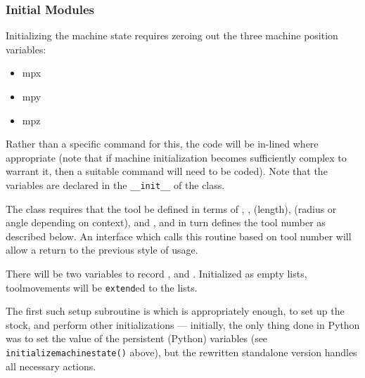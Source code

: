 \documentclass{ltxdoc}
\begin{document}

\subsubsection{Initial Modules}

Initializing the machine state requires zeroing out the three machine position variables:

\begin{itemize}
\item mpx
\item mpy
\item mpz
\end{itemize}

\noindent Rather than a specific command for this, the code will be in-lined where appropriate (note that if machine initialization becomes sufficiently complex to warrant it, then a suitable command will need to be coded). Note that the variables are declared in the \verb|__init__| of the class.

The  class requires that the tool be defined in terms of , ,  (length),  (radius or angle depending on context), and , and in turn defines the tool number as described below. An interface which calls this routine based on tool number will allow a return to the previous style of usage.

There will be two variables to record ,  and . Initialized as empty lists, toolmovements will be \verb|extend|ed to the lists.

The first such setup subroutine is   which is appropriately enough, to set up the stock, and perform other initializations --- initially, the only thing done in Python was to set the value of the persistent (Python) variables (see \verb|initializemachinestate()| above), but the rewritten standalone version handles all necessary actions.
\end{document}
